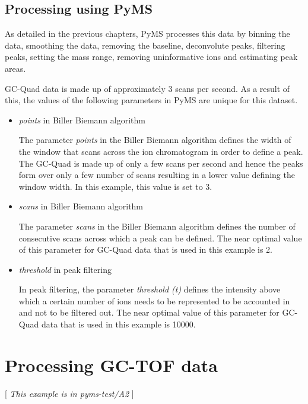 \subsection{Processing using PyMS}
\noindent

As detailed in the previous chapters, PyMS processes this data by binning the data, 
smoothing the data, removing the baseline, deconvolute peaks, filtering peaks, 
setting the mass range, removing uninformative ions and estimating peak areas. 

GC-Quad data is made up of approximately 3 scans per second. As a result of this, 
the values of the following parameters in PyMS are unique for this dataset. 

\begin{itemize}
  \item \emph{points} in Biller Biemann algorithm

   The parameter \emph{points} in the Biller Biemann algorithm defines the width of the window 
   that scans across the ion chromatogram in order to define a peak. The GC-Quad is made 
   up of only a few scans per second and hence the peaks form over only a few number of 
   scans resulting in a lower value defining the window width. In this example, this 
   value is set to 3. 

  \item \emph{scans} in Biller Biemann algorithm

   The parameter \emph{scans} in the Biller Biemann algorithm defines the number of consecutive 
   scans across which a peak can be defined. The near optimal value of this parameter 
   for GC-Quad data that is used in this example is 2. 

  \item \emph{threshold} in peak filtering

   In peak filtering, the parameter \emph{threshold (t)} defines the intensity above which a certain 
   number of ions needs to be represented to be accounted in and not to be filtered out. 
   The near optimal value of this parameter for GC-Quad data that is used in this example 
   is 10000. 

\end{itemize}


\section{Processing GC-TOF data}

[ {\em This example is in pyms-test/A2} ]

